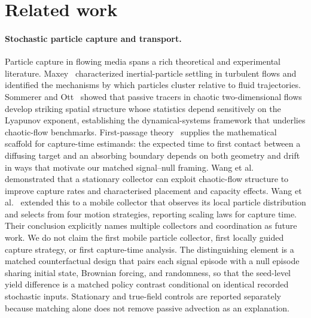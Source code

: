 \documentclass{article}
\begin{document}
\section{Related work}

\paragraph{Stochastic particle capture and transport.}
Particle capture in flowing media spans a rich theoretical and experimental
literature. Maxey~\cite{maxey1987} characterized inertial-particle settling in
turbulent flows and identified the mechanisms by which particles cluster
relative to fluid trajectories. Sommerer and Ott~\cite{sommerer1993} showed
that passive tracers in chaotic two-dimensional flows develop striking spatial
structure whose statistics depend sensitively on the Lyapunov exponent,
establishing the dynamical-systems framework that underlies chaotic-flow
benchmarks. First-passage theory~\cite{redner2001} supplies the mathematical
scaffold for capture-time estimands: the expected time to first contact between
a diffusing target and an absorbing boundary depends on both geometry and drift
in ways that motivate our matched signal--null framing.
Wang et al.~\cite{wang2021stationary} demonstrated that a stationary collector
can exploit chaotic-flow structure to improve capture rates and characterised
placement and capacity effects. Wang et al.~\cite{wang2025collector} extended
this to a mobile collector that observes its local particle distribution and
selects from four motion strategies, reporting scaling laws for capture time.
Their conclusion explicitly names multiple collectors and coordination as future
work.
We do not claim the first mobile particle collector, first locally guided
capture strategy, or first capture-time analysis. The distinguishing element is
a matched counterfactual design that pairs each signal episode with a null
episode sharing initial state, Brownian forcing, and randomness, so that the
seed-level yield difference is a matched policy contrast conditional on
identical recorded stochastic inputs. Stationary and true-field controls are
reported separately because matching alone does not remove passive advection
as an explanation.
\end{document}
